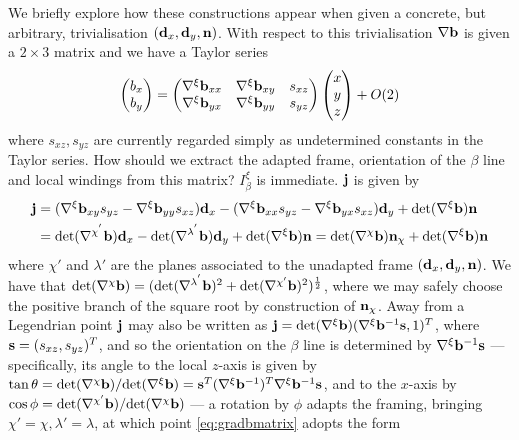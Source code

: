 {We briefly explore how these constructions appear when given a concrete, but arbitrary, trivialisation $(\mathbf{d}_x,\mathbf{d}_y,\mathbf{n})$. With respect to this trivialisation $\nabla \mathbf{b}$ is given a $2\times3$ matrix and we have a Taylor series
\begin{align}
\begin{pmatrix}b_x \\ b_y\end{pmatrix} = 
\begin{pmatrix} 
    \nabla^\xi \mathbf{b}_{xx} & \nabla^\xi \mathbf{b}_{xy} & s_{xz}\\
    \nabla^\xi \mathbf{b}_{yx} & \nabla^\xi \mathbf{b}_{yy} & s_{yz}\\ 
\end{pmatrix}
\begin{pmatrix}x \\ y \\ z \end{pmatrix}  
+ O(2)
\label{eq:gradbmatrix}
\end{align}
where $s_{xz},s_{yz}$ are currently regarded simply as undetermined constants in the Taylor series. How should we extract the adapted frame, orientation of the $\beta$ line and local windings from this matrix? $I_\beta^\xi$ is immediate. $\mathbf{j}$ is given by
\begin{align}
    \mathbf{j} &= (\nabla^\xi \mathbf{b}_{xy}s_{yz} - \nabla^\xi \mathbf{b}_{yy}s_{xz})\mathbf{d}_x -( \nabla^\xi \mathbf{b}_{xx}s_{yz} - \nabla^\xi \mathbf{b}_{yx}s_{xz})\mathbf{d}_y + \mathrm{det}(\nabla^\xi \mathbf{b}) \mathbf{n} \\
         &= \mathrm{det}(\nabla^{\chi^{'}} \mathbf{b})\mathbf{d}_x  -\mathrm{det}(\nabla^{\lambda^{'}} \mathbf{b})\mathbf{d}_y + \mathrm{det}(\nabla^\xi \mathbf{b}) \mathbf{n} = \mathrm{det}(\nabla^{\chi}\mathbf{b})\mathbf{n}_\chi + \mathrm{det}(\nabla^\xi \mathbf{b}) \mathbf{n}
\end{align}
where $\chi'$ and $\lambda'$ are the planes associated to the unadapted frame $(\mathbf{d}_x,\mathbf{d}_y, \mathbf{n})$. We have that $\mathrm{det}(\nabla^{\chi} \mathbf{b})= (\mathrm{det}(\nabla^{\lambda^{'}} \mathbf{b})^2 + \mathrm{det}(\nabla^{\chi'}\mathbf{b})^2)^\frac{1}{2}$, where we may safely choose the positive branch of the square root by construction of $\mathbf{n}_\chi$. Away from a Legendrian point $\mathbf{j}$ may also be written as $\mathbf{j} = \mathrm{det}(\nabla^\xi \mathbf{b})(\nabla^\xi \mathbf{b}^{-1}\mathbf{s},1)^T$, where $\mathbf{s} = (s_{xz}, s_{yz})^T$, and so the orientation on the $\beta$ line is determined by $\nabla^\xi \mathbf{b}^{-1} \mathbf{s}$ --- specifically, its angle to the local $z$-axis is given by $\tan\theta = \mathrm{det}(\nabla^{\chi}\mathbf{b})/ \mathrm{det}(\nabla^{\xi}\mathbf{b})= \mathbf{s}^T (\nabla^\xi \mathbf{b}^{-1})^T \nabla^\xi \mathbf{b}^{-1} \mathbf{s}$, and to the $x$-axis by $\cos \phi =\mathrm{det}(\nabla^{\chi'}\mathbf{b}) /\mathrm{det}(\nabla^{\chi}\mathbf{b})$ --- a rotation by $\phi$ adapts the framing, bringing $\chi'=\chi, \lambda' = \lambda$, at which point \eqref{eq:gradbmatrix} adopts the form
}
